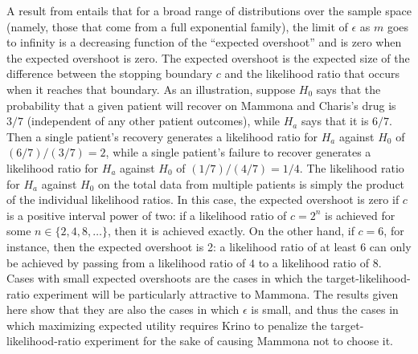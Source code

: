 \documentclass{article}
\theoremstyle{definition}
\begin{document}
A result from \citet[1201]{blume08} entails that for a broad range of distributions over the sample space (namely, those that come from a full exponential family), the limit of $\epsilon$ as $m$ goes to infinity is a decreasing function of the ``expected overshoot'' and is zero when the expected overshoot is zero.
The expected overshoot is the expected size of the difference between the stopping boundary $c$ and the likelihood ratio that occurs when it reaches that boundary.
As an illustration, suppose $H_0$ says that the probability that a given patient will recover on Mammona and Charis's drug is $3/7$ (independent of any other patient outcomes), while $H_a$ says that it is $6/7$.
Then a single patient's recovery generates a likelihood ratio for $H_a$ against $H_0$ of $(6/7)/(3/7)=2$, while a single patient's failure to recover generates a likelihood ratio for $H_a$ against $H_0$ of $(1/7)/(4/7)=1/4$.
The likelihood ratio for $H_a$ against $H_0$ on the total data from multiple patients is simply the product of the individual likelihood ratios.
In this case, the expected overshoot is zero if $c$ is a positive interval power of two: if a likelihood ratio of $c=2^n$ is achieved for some $n\in \{2, 4, 8, \ldots\}$, then it is achieved exactly.
On the other hand, if $c=6$, for instance, then the expected overshoot is 2: a likelihood ratio of at least $6$ can only be achieved by passing from a likelihood ratio of $4$ to a likelihood ratio of $8$.
Cases with small expected overshoots are the cases in which the target-likelihood-ratio experiment will be particularly attractive to Mammona.
The results given here show that they are also the cases in which $\epsilon$ is small, and thus the cases in which maximizing expected utility requires Krino to penalize the target-likelihood-ratio experiment for the sake of causing Mammona not to choose it.
\end{document}
